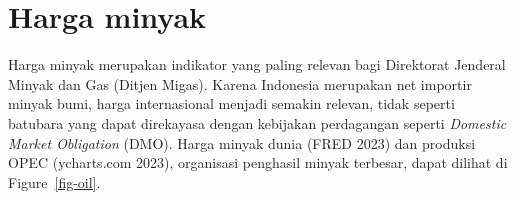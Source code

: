 \documentclass[
  a4paper,
  DIV=11,
  numbers=noendperiod]{scrreprt}
\begin{document}
\hypertarget{harga-minyak}{%
\section{Harga minyak}\label{harga-minyak}}

Harga minyak merupakan indikator yang paling relevan bagi Direktorat
Jenderal Minyak dan Gas (Ditjen Migas). Karena Indonesia merupakan net
importir minyak bumi, harga internasional menjadi semakin relevan, tidak
seperti batubara yang dapat direkayasa dengan kebijakan perdagangan
seperti \emph{Domestic Market Obligation} (DMO). Harga minyak dunia
(FRED 2023) dan produksi OPEC (ycharts.com 2023), organisasi penghasil
minyak terbesar, dapat dilihat di Figure~\ref{fig-oil}.

\begin{figure}

\begin{minipage}[t]{0.50\linewidth}

{\centering 


}

\end{minipage}%
%
\begin{minipage}[t]{0.50\linewidth}

{\centering 

}
\end{minipage}
\end{figure}
\end{document}
